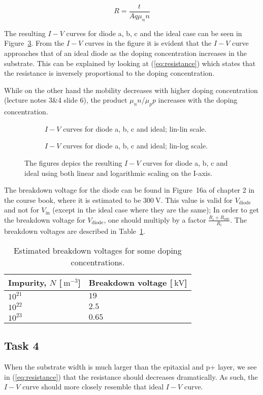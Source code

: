 \documentclass[12pt,a4paper]{article}
\begin{document}
\begin{equation}
  \label{eq:resistance_red}
  R=\frac{t}{A q \mu_n n}
\end{equation}

The resulting $I-V$ curves for diode a, b, c and the ideal case can be seen in Figure~\ref{fig:iv_curves}.
From the $I-V$ curves in the figure it is evident that the $I-V$ curve approaches that of an ideal diode as the doping concentration increases in the substrate.
This can be explained by looking at (\ref{eq:resistance}) which states that the resistance is inversely proportional to the doping concentration.

While on the other hand the mobility decreases with higher doping concentration (lecture notes 3\&4 slide 6), the product $\mu_nn$/$\mu_pp$ increases with the doping concentration.
\begin{figure}[!ht]
  \begin{subfigure}{0.49\textwidth}
    \centering
    \noindent{}
    \caption{$I-V$ curves for diode a, b, c and ideal; lin-lin scale.}
    \label{fig:iv_linlin}
  \end{subfigure}
  \begin{subfigure}{0.49\textwidth}
    \centering
    \noindent{}
    \caption{$I-V$ curves for diode a, b, c and ideal; lin-log scale.}
    \label{fig:iv_linlog}
  \end{subfigure}
  \caption{The figures depics the resulting $I-V$ curves for diode a, b, c and ideal using both linear and logarithmic scaling on the I-axis.}
  \label{fig:iv_curves}
\end{figure}

The breakdown voltage for the diode can be found in Figure~16a of chapter 2 in the course book, where it is estimated to be $\SI{300}{\volt}$.
This value is valid for $V_{\text{diode}}$ and not for $V_{\text{in}}$ (except in the ideal case where they are the same);
In order to get the breakdown voltage for $V_{\text{diode}}$, one should multiply by a factor $\frac{R_i+R_{\text{sub}}}{R_i}$.
The breakdown voltages are described in Table~\ref{tab:breakdown}.
\begin{table}
  \centering
  \caption{Estimated breakdown voltages for some doping concentrations.}
  \begin{tabular}{|l|l|} \hline
    Impurity, $N$ [$\SI{}{\metre^{-3}}$] & Breakdown voltage [$\SI{}{\kilo\volt}$] \\\hline
    $10^{21}$ & $19$ \\\hline
    $10^{22}$ & $2.5$ \\\hline
    $10^{23}$ & $0.65$ \\\hline
  \end{tabular}
  \label{tab:breakdown}
\end{table}

\subsection{Task 4}
When the substrate width is much larger than the epitaxial and p+ layer, we see in (\ref{eq:resistance}) that the resistance should decreases dramatically.
As such, the $I-V$ curve should more closely resemble that ideal $I-V$ curve.
\end{document}
